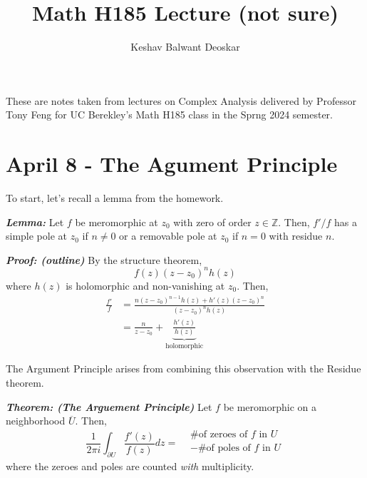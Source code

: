 \documentclass{article}
\title{Math H185 Lecture (not sure)}
\author{Keshav Balwant Deoskar}
\begin{document}
\maketitle

These are notes taken from lectures on Complex Analysis delivered by Professor Tony Feng for UC Berekley's Math H185 class in the Sprng 2024 semester.

\tableofcontents

\pagebreak

\section{April 8 - The Agument Principle}

To start, let's recall a lemma from the homework.

\begin{dottedbox}
  \emph{\textbf{Lemma:}} Let $f$ be meromorphic at $z_0$ with zero of order $z \in \mathbb{Z}$. Then, $f'/f$ has a simple pole at $z_0$ if $n \neq 0$ or a removable pole at $z_0$ if $n = 0$ with residue $n$.
\end{dottedbox}

\emph{\textbf{Proof: (outline)}}
By the structure theorem, 
\[ f(z)  (z-z_0)^n h(z) \]  where $h(z)$ is holomorphic and non-vanishing at $z_0$. Then, 
\begin{align*}
  \frac{f'}{f} &= \frac{n(z-z_0)^{n-1}h(z) + h'(z)(z-z_0)^n}{(z-z_0)^n h(z)} \\
  &= \frac{n}{z-z_0} + \underbrace{\frac{h'(z)}{h(z)}}_{\text{holomorphic}}
\end{align*}

\vskip 0.5cm
The Argument Principle arises from combining this observation with the Residue theorem.

\vskip 0.5cm
\begin{dottedbox}
  \emph{\textbf{Theorem: (The Arguement Principle)}} Let $f$ be meromorphic on a neighborhood $\overline{U}$. Then,
  \[ \frac{1}{2\pi i} \int_{\partial U} \frac{f'(z)}{f(z)} dz = \begin{matrix}
    &\text{\# of zeroes of $f$ in $U$} \\
    &-\text{\# of poles of $f$ in $U$} \\
  \end{matrix} \] 
  where the zeroes and poles are counted \emph{with} multiplicity.
\end{dottedbox}
\end{document}
